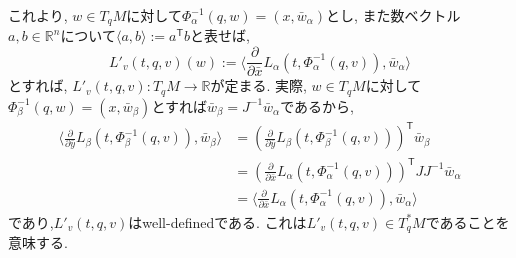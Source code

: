 \documentclass[a4paper]{ujarticle}
\numberwithin{equation}{section}
\theoremstyle{definition}
\begin{document}
        これより, $w \in T_q M$に対して$\Phi^{-1}_{\alpha}(q, w) = (x, \bar{w}_{\alpha})$とし, 
        また数ベクトル$a, b \in \mathbb{R}^n$について$\langle a, b \rangle := a^{\mathsf{T}} b$と表せば, 
        \[
            L'_v(t, q, v)(w) := \langle \frac{\partial}{\partial \bar{x}} L_{\alpha}(t, \Phi_{\alpha}^{-1}(q, v)), \bar{w}_{\alpha}\rangle 
        \]
        とすれば, $L'_v(t, q, v): T_q M \rightarrow \mathbb{R}$が定まる.
        実際, $w \in T_q M$に対して$\Phi^{-1}_{\beta}(q, w) = (x, \bar{w}_{\beta})$とすれば$\bar{w}_{\beta} = J^{-1} \bar{w}_{\alpha}$であるから,
        \begin{align}
            \langle \frac{\partial}{\partial \bar{y}} L_{\beta} (t, \Phi_{\beta}^{-1}(q, v)), \bar{w}_{\beta}\rangle 
            &= \left( \frac{\partial}{\partial \bar{y}} L_{\beta} (t, \Phi_{\beta}^{-1}(q, v)) \right)^{\mathsf{T}} \bar{w}_{\beta} \\
            &= \left( \frac{\partial}{\partial \bar{x}} L_{\alpha} (t, \Phi_{\alpha}^{-1}(q, v)) \right)^{\mathsf{T}} J J^{-1}\bar{w}_{\alpha} \\
            &= \langle \frac{\partial}{\partial \bar{x}} L_{\alpha} (t, \Phi_{\alpha}^{-1}(q, v)), \bar{w}_{\alpha}\rangle 
        \end{align}
        であり,$L'_v(t, q, v)$はwell-definedである.
        これは$L'_v(t, q, v) \in T^{*}_q M$であることを意味する.
\end{document}
